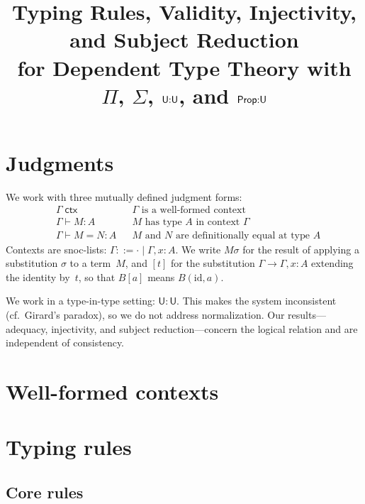 \documentclass[11pt]{article}
\title{Typing Rules, Validity, Injectivity, and Subject Reduction\\
  for Dependent Type Theory with $\Pi$, $\Sigma$, $\U{:}\U$, and $\Prop{:}\U$}
\author{}
\date{}
\newcommand{\wf}[1]{#1\;\mathsf{ctx}}
\newcommand{\hastype}[3]{#1 \vdash #2 : #3}
\newcommand{\conveq}[4]{#1 \vdash #2 = #3 : #4}
\newcommand{\U}{\mathsf{U}}
\begin{document}
\maketitle

\section{Judgments}

We work with three mutually defined judgment forms:
\begin{align*}
  &\wf{\Gamma}                  &&\text{$\Gamma$ is a well-formed context}\\
  &\hastype{\Gamma}{M}{A}       &&\text{$M$ has type $A$ in context $\Gamma$}\\
  &\conveq{\Gamma}{M}{N}{A}     &&\text{$M$ and $N$ are definitionally equal at type $A$}
\end{align*}
Contexts are snoc-lists: $\Gamma ::= \cdot \mid \Gamma, x{:}A$.
We write $M\sigma$ for the result of applying a substitution
$\sigma$ to a term~$M$, and $[t]$ for the substitution
$\Gamma \to \Gamma, x{:}A$ extending the identity by~$t$,
so that $B[a]$ means $B(\mathrm{id}, a)$.

We work in a type-in-type setting: $\U : \U$.  This makes the
system inconsistent (cf.\ Girard's paradox), so we do not
address normalization.  Our results---adequacy, injectivity,
and subject reduction---concern the logical relation and are
independent of consistency.

\section{Well-formed contexts}


\section{Typing rules}

\subsection*{Core rules}

\end{document}
